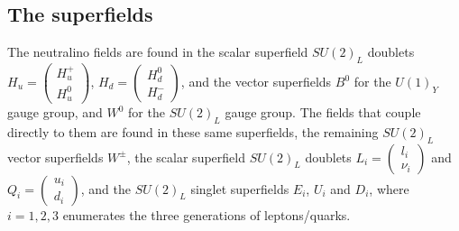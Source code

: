 \documentclass[english, notitlepage]{article}
\begin{document}
    \subsection{The superfields}
        The neutralino fields are found in the scalar superfield \(SU(2)_L\) doublets $H_u = \begin{pmatrix} H_u^+ \\ H_u^0 \end{pmatrix}$, $H_d = \begin{pmatrix} H_d^0 \\ H_d^- \end{pmatrix}$, and the vector superfields $B^0$ for the $U(1)_Y$ gauge group, and $W^0$ for the $SU(2)_L$ gauge group.
        The fields that couple directly to them are found in these same superfields, the remaining \(SU(2)_L\) vector superfields \(W^\pm\), the scalar superfield \(SU(2)_L\) doublets $L_i = \begin{pmatrix} l_i \\ \nu_i \end{pmatrix}$ and $Q_i = \begin{pmatrix} u_i \\ d_i \end{pmatrix}$, and the $SU(2)_L$ singlet superfields $E_i$, $U_i$ and $D_i$, where \(i=1,2,3\) enumerates the three generations of leptons/quarks.
\end{document}
